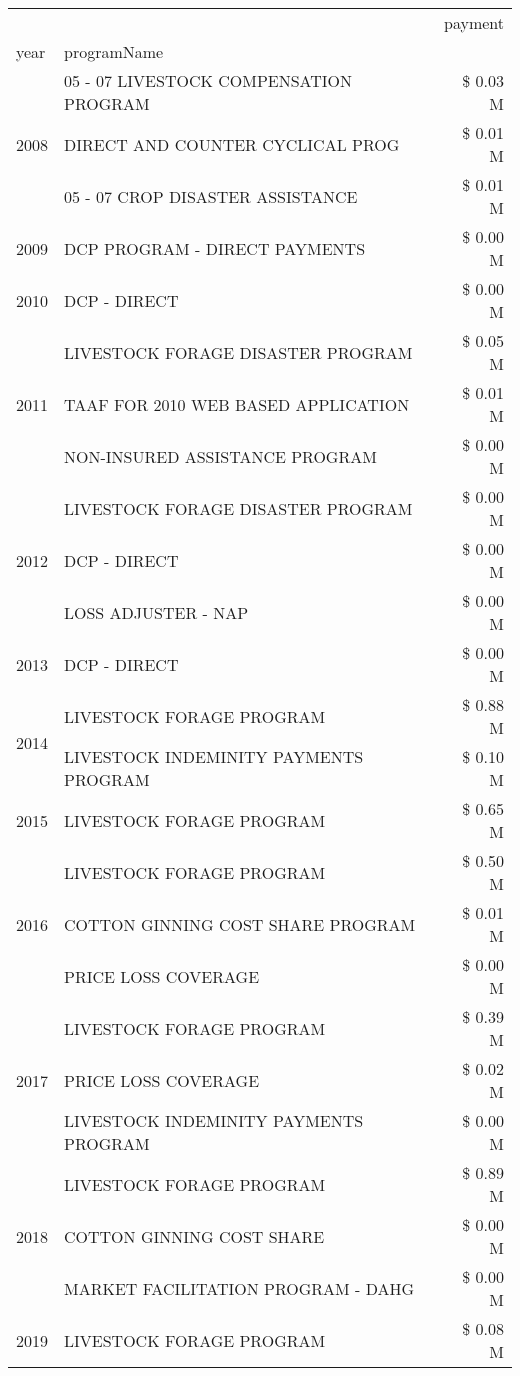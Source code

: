 \begin{tabular}{llr}
\toprule
 &  & payment \\
year & programName &  \\
\midrule
\multirow[t]{3}{*}{2008} & 05 - 07 LIVESTOCK COMPENSATION PROGRAM & \$ 0.03 M \\
 & DIRECT AND COUNTER CYCLICAL PROG & \$ 0.01 M \\
 & 05 - 07 CROP DISASTER ASSISTANCE & \$ 0.01 M \\
\cline{1-3}
2009 & DCP PROGRAM - DIRECT PAYMENTS & \$ 0.00 M \\
\cline{1-3}
2010 & DCP - DIRECT & \$ 0.00 M \\
\cline{1-3}
\multirow[t]{3}{*}{2011} & LIVESTOCK FORAGE DISASTER PROGRAM & \$ 0.05 M \\
 & TAAF FOR 2010 WEB BASED APPLICATION & \$ 0.01 M \\
 & NON-INSURED ASSISTANCE PROGRAM & \$ 0.00 M \\
\cline{1-3}
\multirow[t]{3}{*}{2012} & LIVESTOCK FORAGE DISASTER PROGRAM & \$ 0.00 M \\
 & DCP - DIRECT & \$ 0.00 M \\
 & LOSS ADJUSTER - NAP & \$ 0.00 M \\
\cline{1-3}
2013 & DCP - DIRECT & \$ 0.00 M \\
\cline{1-3}
\multirow[t]{2}{*}{2014} & LIVESTOCK FORAGE PROGRAM & \$ 0.88 M \\
 & LIVESTOCK INDEMINITY PAYMENTS PROGRAM & \$ 0.10 M \\
\cline{1-3}
2015 & LIVESTOCK FORAGE PROGRAM & \$ 0.65 M \\
\cline{1-3}
\multirow[t]{3}{*}{2016} & LIVESTOCK FORAGE PROGRAM & \$ 0.50 M \\
 & COTTON GINNING COST SHARE PROGRAM & \$ 0.01 M \\
 & PRICE LOSS COVERAGE & \$ 0.00 M \\
\cline{1-3}
\multirow[t]{3}{*}{2017} & LIVESTOCK FORAGE PROGRAM & \$ 0.39 M \\
 & PRICE LOSS COVERAGE & \$ 0.02 M \\
 & LIVESTOCK INDEMINITY PAYMENTS PROGRAM & \$ 0.00 M \\
\cline{1-3}
\multirow[t]{3}{*}{2018} & LIVESTOCK FORAGE PROGRAM & \$ 0.89 M \\
 & COTTON GINNING COST SHARE & \$ 0.00 M \\
 & MARKET FACILITATION PROGRAM - DAHG & \$ 0.00 M \\
\cline{1-3}
\multirow[t]{3}{*}{2019} & LIVESTOCK FORAGE PROGRAM & \$ 0.08 M \\

\end{tabular}
